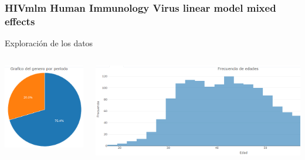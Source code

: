 \documentclass{beamer}%
\begin{document}
\begin{frame}
\frametitle{\textbf{HIVmlm Human Immunology Virus linear model mixed effects}}
 
  	Exploraci\'on de los datos
  	\begin{columns}[t]
 \begin{center}\includegraphics[height=0.3\textheight]{torta.PNG}\end{center}
   
    \begin{center}\includegraphics[height=0.3\textheight]{histograma.PNG}\end{center}
  \end{columns}
 
\end{frame}
\end{document}
